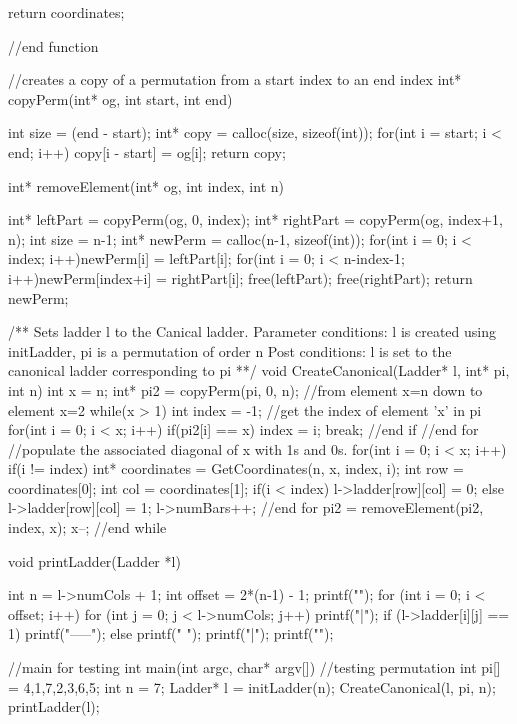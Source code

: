 \begin{singlespace}
\begin{footnotesize}
\begin{code}
{	return coordinates;

}//end function

//creates a copy of a permutation from a start index to an end index
int* copyPerm(int* og, int start, int end){
	
	int size = (end - start);
	int* copy = calloc(size, sizeof(int));
	for(int i = start; i < end; i++){
		copy[i - start] = og[i];
	}
	return copy;
}

int* removeElement(int* og, int index, int n){

	int* leftPart = copyPerm(og, 0, index);
	int* rightPart = copyPerm(og, index+1, n);
	int size = n-1;
	int* newPerm = calloc(n-1, sizeof(int));
	for(int i = 0; i < index; i++)newPerm[i] = leftPart[i];
	for(int i = 0; i < n-index-1; i++)newPerm[index+i] = rightPart[i];
	free(leftPart);
	free(rightPart);
	return newPerm;
}

/**
Sets ladder l to the Canical ladder. 
Parameter conditions: l is created using initLadder, pi is a permutation of order n
Post conditions: l is set to the canonical ladder corresponding to pi
**/
void CreateCanonical(Ladder* l, int* pi, int n)
{
	int x = n;
	int* pi2 = copyPerm(pi, 0, n);
	//from element x=n down to element x=2
	while(x > 1)
	{
		int index = -1;
		//get the index of element 'x' in pi
		for(int i = 0; i < x; i++){
			if(pi2[i] == x){
				index = i;
				break;
			}//end if
		}//end for
		//populate the associated diagonal of x with 1s and 0s.
		for(int i = 0; i < x; i++){
			if(i != index){
				int* coordinates = GetCoordinates(n, x, index, i);
				int row = coordinates[0];
				int col = coordinates[1];
				if(i < index){
                    l->ladder[row][col] = 0;
				}else{
                    l->ladder[row][col] = 1;
					l->numBars++; 
				}
			}
		}//end for
		pi2 = removeElement(pi2, index, x);
        x--;
	}//end while
}

void printLadder(Ladder *l)
{
   
    int n = l->numCols + 1;
    int offset = 2*(n-1) - 1;
    printf("\n\n");
    for (int i = 0; i < offset; i++)
    {
        for (int j = 0; j < l->numCols; j++)
        {
            printf("|");
            if (l->ladder[i][j] == 1)
                printf("-----");
            else
                printf("     ");
        }
        printf("|");
        printf("\n");
    }
}


//main for testing
int main(int argc, char* argv[])
{
    //testing permutation
    int pi[] = {4,1,7,2,3,6,5};
    int n = 7;
    Ladder* l = initLadder(n);
    CreateCanonical(l, pi, n);
    printLadder(l);
}

\end{code}
\end{footnotesize}
\end{singlespace}

